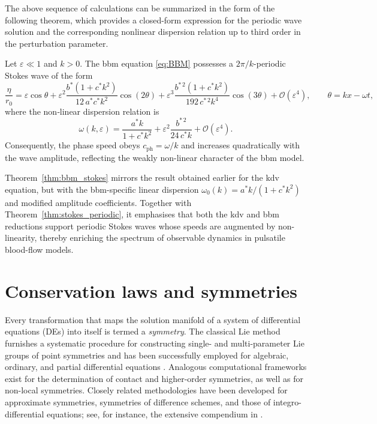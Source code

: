 \documentclass[alpha-refs, 12pt]{wiley-article}
\renewcommand{\O}{\mathcal{O}}
\newcommand{\eps}{\varepsilon}
\begin{document}
The above sequence of calculations can be summarized in the form of the following theorem, which provides a closed-form expression for the periodic wave solution and the corresponding nonlinear dispersion relation up to third order in the perturbation parameter.
\begin{theorem}\label{thm:bbm_stokes}
Let $\eps\ll1$ and $k>0$. The \acrshort{bbm} equation \eqref{eq:BBM} possesses a $2\pi/k$-periodic Stokes wave of the form
\begin{equation}\label{eq:bbm_eta_series}
  \frac{\eta}{r_{0}}
  =\eps\cos\theta
   +\eps^{2}
      \frac{b^{\ast}(1+c^{\ast}k^{2})}{12\,a^{\ast}c^{\ast}k^{2}}
      \cos(2\theta)
   +\eps^{3}
      \frac{b^{\ast\,2}(1+c^{\ast}k^{2})}{192\,c^{\ast\,2}k^{4}}
      \cos(3\theta)
   +\O(\eps^{4}), \qquad \theta=kx-\omega t,
  \end{equation}
where the non‐linear dispersion relation is
\begin{equation}\label{eq:bbm_dispersion}
  \omega(k,\eps)
  =\frac{a^{\ast}k}{1+c^{\ast}k^{2}}
   +\eps^{2}\frac{b^{\ast\,2}}{24\,c^{\ast}k}
   +\O(\eps^{4}).
\end{equation}
Consequently, the phase speed obeys
\(
  c_{\mathrm{ph}}=\omega/k
\)
and increases quadratically with the wave amplitude, reflecting the weakly non-linear character of the \acrshort{bbm} model.
\end{theorem}

Theorem~\ref{thm:bbm_stokes} mirrors the result obtained earlier for the \acrshort{kdv} equation, but with the \acrshort{bbm}-specific linear dispersion
\(
  \omega_{0}(k)=a^{\ast}k/(1+c^{\ast}k^{2})
\)
and modified amplitude coefficients. Together with Theorem~\ref{thm:stokes_periodic}, it emphasises that both the \acrshort{kdv} and \acrshort{bbm} reductions support periodic Stokes waves whose speeds are augmented by non-linearity, thereby enriching the spectrum of observable dynamics in pulsatile blood-flow models.

\section{Conservation laws and symmetries}
\label{sec:cons_sym}

Every transformation that maps the solution manifold of a system of differential equations (DEs) into itself is termed a \emph{symmetry}. The classical Lie method furnishes a systematic procedure for constructing single- and multi-parameter Lie groups of point symmetries and has been successfully employed for algebraic, ordinary, and partial differential equations \cite{Cheviakov2007}. Analogous computational frameworks exist for the determination of contact and higher-order symmetries, as well as for non-local symmetries. Closely related methodologies have been developed for approximate symmetries, symmetries of difference schemes, and those of integro-differential equations; see, for instance, the extensive compendium in \cite{Ibragimov1995}.
\end{document}
